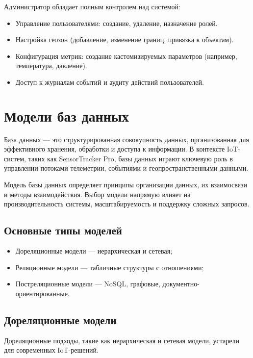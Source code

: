 Администратор обладает полным контролем над системой:
\begin{itemize}
	\item Управление пользователями: создание, удаление, назначение ролей.
	\item Настройка геозон (добавление, изменение границ, привязка к объектам).
	\item Конфигурация метрик: создание кастомизируемых параметров (например, температура, давление).
	\item Доступ к журналам событий и аудиту действий пользователей.
\end{itemize}



\clearpage

\section{Модели баз данных}

База данных — это структурированная совокупность данных, организованная для эффективного хранения, обработки и доступа к информации. В контексте IoT-систем, таких как SensorTracker Pro, базы данных играют ключевую роль в управлении потоками телеметрии, событиями и геопространственными данными.

Модель базы данных определяет принципы организации данных, их взаимосвязи и методы взаимодействия. Выбор модели напрямую влияет на производительность системы, масштабируемость и поддержку сложных запросов.

\subsection{Основные типы моделей}
\begin{itemize}
	\item Дореляционные модели — иерархическая и сетевая;
	\item Реляционные модели — табличные структуры с отношениями;
	\item Постреляционные модели — NoSQL, графовые, документно-ориентированные.
\end{itemize}

\subsection{Дореляционные модели}
Дореляционные подходы, такие как иерархическая и сетевая модели, устарели для современных IoT-решений.

